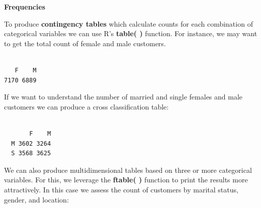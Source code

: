 \documentclass[
  letterpaper,
  DIV=11,
  numbers=noendperiod]{scrreprt}
\newenvironment{Shaded}{\begin{snugshade}}{\end{snugshade}}
\newcommand{\AttributeTok}[1]{\textcolor[rgb]{0.40,0.45,0.13}{#1}}
\newcommand{\CommentTok}[1]{\textcolor[rgb]{0.37,0.37,0.37}{#1}}
\newcommand{\FunctionTok}[1]{\textcolor[rgb]{0.28,0.35,0.67}{#1}}
\newcommand{\NormalTok}[1]{\textcolor[rgb]{0.00,0.23,0.31}{#1}}
\newcommand{\OtherTok}[1]{\textcolor[rgb]{0.00,0.23,0.31}{#1}}
\newcommand{\SpecialCharTok}[1]{\textcolor[rgb]{0.37,0.37,0.37}{#1}}
\newcommand{\StringTok}[1]{\textcolor[rgb]{0.13,0.47,0.30}{#1}}
\begin{document}
\textbf{Frequencies}

To produce \textbf{contingency tables} which calculate counts for each
combination of categorical variables we can use R's \textbf{table( )}
function. For instance, we may want to get the total count of female and
male customers.

\begin{Shaded}
\end{Shaded}

\begin{verbatim}

   F    M 
7170 6889 
\end{verbatim}

If we want to understand the number of married and single females and
male customers we can produce a cross classification table:

\begin{Shaded}
\end{Shaded}

\begin{verbatim}
   
       F    M
  M 3602 3264
  S 3568 3625
\end{verbatim}

We can also produce multidimensional tables based on three or more
categorical variables. For this, we leverage the \textbf{ftable( )}
function to print the results more attractively. In this case we assess
the count of customers by marital status, gender, and location:

\begin{Shaded}
\end{Shaded}
\end{document}
